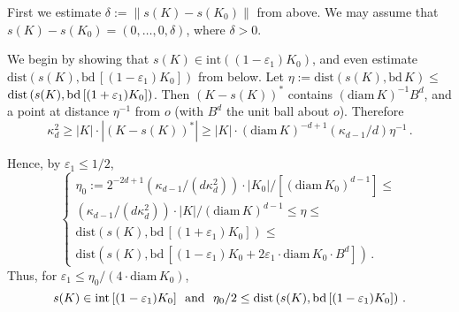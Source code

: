 \documentclass[12pt]{article}
\begin{document}
First
we estimate $\delta := \| s(K)-s(K_0) \| $ 
from above. We may assume that $s(K)-s(K_0)
= (0, \ldots , 0, \delta )$, where $\delta > 0$. 

We begin by showing that
$s(K) \in {\text{int}} \left( (1- \varepsilon _1)K_0 \right) $, 
and even estimate ${\text{dist}} 
\left( s(K) , {\text{bd}}\,[(1- \varepsilon _1)K_0] \right) $ from below.
Let $ \eta := {\text{dist}} \left( s(K) , {\text{bd}}\,K  \right) \le $
${\text{dist}} 
\newline
\left( s(K) , {\text{bd}}\,[(1 + \varepsilon _1)K_0] \right) $. 
Then $\left( K-s(K) \right) ^* $ contains
$({\text{diam}}\,K)^{-1}B^d$, and a
point at distance $\eta ^{-1}$ from $o$ (with $B^d$ the unit ball about $o$).
Therefore 
\begin{equation}
\label{eta}
\kappa _d ^2 \ge | K | \cdot | \left( K-s(K) \right) ^* | 
\ge |K| \cdot ({\text{diam}}\,K)^{-d+1} ( \kappa _{d-1}/d ) \eta ^{-1}\,.
\end{equation}

Hence, by $\varepsilon _1 \le 1/2$, 
$$
\begin{cases}
\eta _0 := 2^{-2d+1}
\left( \kappa _{d-1}/(d \kappa _d ^2) \right) \cdot |K_0|/
[({\text{diam}}\,K_0) ^{d-1}] \le  \\
\left( \kappa _{d-1}/(d \kappa _d ^2) \right) \cdot |K|/
({\text{diam}}\,K) ^{d-1}
\le \eta \le  \\
{\text{dist}} \left( s(K) , {\text{bd}}\,[ (1 + \varepsilon _1)K_0 ] \right)
\le \\
{\text{dist}} \left( s(K) , {\text{bd}}\,[ (1 - \varepsilon _1)K_0 +2
\varepsilon _1 \cdot {\text{diam}}\,K_0 \cdot B^d ] \right) \,.
\end{cases}
$$
Thus, for $\varepsilon _1
\le \eta _0/(4 \cdot {\text{diam}}\,K_0)$, 
$$
s(K) \in {\text{int}}\,[(1 - \varepsilon _1)K_0] {\text{\,\,\,\,and\,\,\,\,}}
\eta _0/2 \le
{\text{dist}} \left( s(K) , {\text{bd}}\,[ (1 - \varepsilon _1)K_0 ] \right)
\,.
$$
\end{document}
